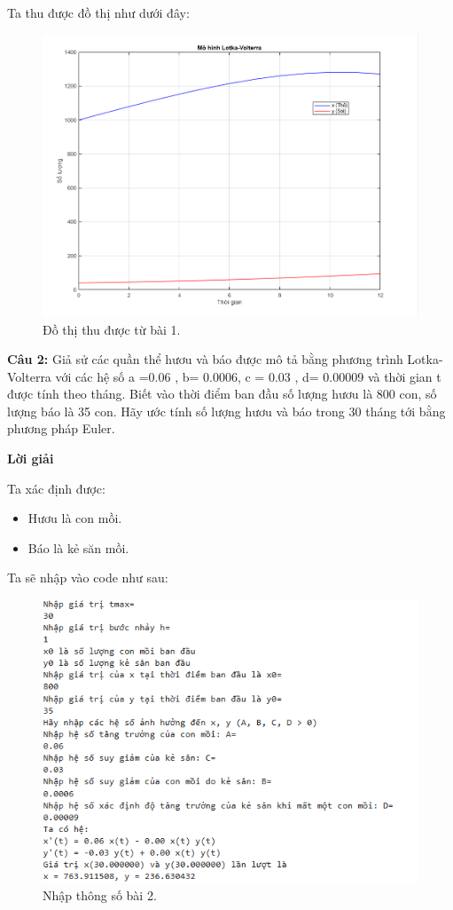 \documentclass[a4paper,15pt]{article}
\begin{document}
Ta thu được đồ thị như dưới đây: \\
\begin{figure}[H]
    \centering
    \includegraphics[scale=0.5]{img/Dothibai1.png}
    \caption{Đồ thị thu được từ bài 1.}
    \label{fig:enter-label}
\end{figure} 
\textbf{Câu 2:} 
Giả sử các quần thể hươu và báo được mô tả bằng phương trình Lotka-Volterra với các hệ số a =0.06 , b= 0.0006, c = 0.03 , d= 0.00009 và thời gian t được tính theo tháng. Biết vào thời điểm ban đầu số lượng hươu là 800 con, số lượng báo là 35 con. Hãy ước tính số lượng hươu và báo trong 30 tháng tới bằng phương pháp Euler.
\begin{center}
    \textbf{Lời giải}
\end{center}
Ta xác định được:
\begin{itemize}
    \item Hươu là con mồi.
    \item Báo là kẻ săn mồi.
\end{itemize}
Ta sẽ nhập vào code như sau:
\begin{figure}[H]
    \centering
    \includegraphics[scale=0.75]{img/Nhapvao2.png}
    \caption{Nhập thông số bài 2.}
    \label{fig:enter-label}
\end{figure}
\end{document}
